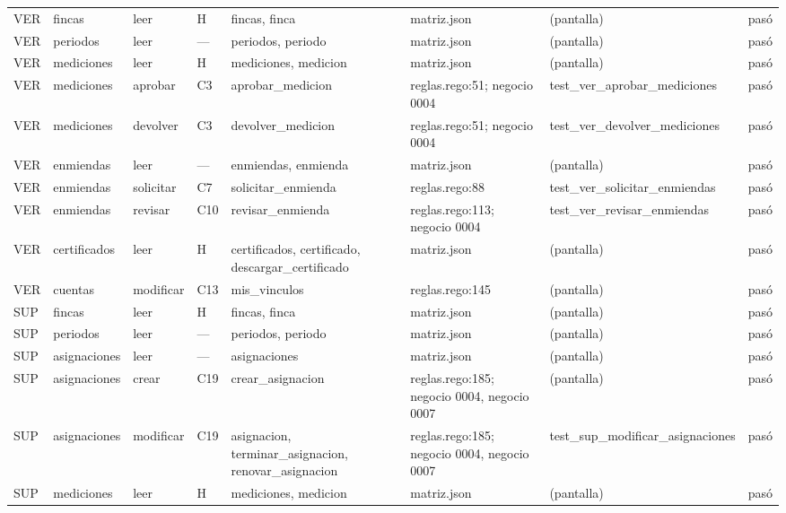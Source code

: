 \documentclass[11pt,letterpaper]{article}
\begin{document}
\begin{center}
\begin{longtable}{@{}p{0.6cm} p{1.7cm} p{1.2cm} p{0.9cm} p{3.4cm} p{2.6cm} p{3.4cm} p{0.8cm}@{}}
VER & fincas & leer & H & fincas, \allowbreak{}finca & matriz.json & (pantalla) & pasó \\
VER & periodos & leer & — & periodos, \allowbreak{}periodo & matriz.json & (pantalla) & pasó \\
VER & mediciones & leer & H & mediciones, \allowbreak{}medicion & matriz.json & (pantalla) & pasó \\
VER & mediciones & aprobar & C3 & aprobar\_medicion & reglas.rego:51; negocio 0004 & test\_\allowbreak{}ver\_\allowbreak{}aprobar\_\allowbreak{}mediciones & pasó \\
VER & mediciones & devolver & C3 & devolver\_medicion & reglas.rego:51; negocio 0004 & test\_\allowbreak{}ver\_\allowbreak{}devolver\_\allowbreak{}mediciones & pasó \\
VER & enmiendas & leer & — & enmiendas, \allowbreak{}enmienda & matriz.json & (pantalla) & pasó \\
VER & enmiendas & solicitar & C7 & solicitar\_enmienda & reglas.rego:88 & test\_\allowbreak{}ver\_\allowbreak{}solicitar\_\allowbreak{}enmiendas & pasó \\
VER & enmiendas & revisar & C10 & revisar\_enmienda & reglas.rego:113; negocio 0004 & test\_\allowbreak{}ver\_\allowbreak{}revisar\_\allowbreak{}enmiendas & pasó \\
VER & certificados & leer & H & certificados, \allowbreak{}certificado, \allowbreak{}descargar\_certificado & matriz.json & (pantalla) & pasó \\
VER & cuentas & modificar & C13 & mis\_vinculos & reglas.rego:145 & (pantalla) & pasó \\
SUP & fincas & leer & H & fincas, \allowbreak{}finca & matriz.json & (pantalla) & pasó \\
SUP & periodos & leer & — & periodos, \allowbreak{}periodo & matriz.json & (pantalla) & pasó \\
SUP & asignaciones & leer & — & asignaciones & matriz.json & (pantalla) & pasó \\
SUP & asignaciones & crear & C19 & crear\_asignacion & reglas.rego:185; negocio 0004, negocio 0007 & (pantalla) & pasó \\
SUP & asignaciones & modificar & C19 & asignacion, \allowbreak{}terminar\_asignacion, \allowbreak{}renovar\_asignacion & reglas.rego:185; negocio 0004, negocio 0007 & test\_\allowbreak{}sup\_\allowbreak{}modificar\_\allowbreak{}asignaciones & pasó \\
SUP & mediciones & leer & H & mediciones, \allowbreak{}medicion & matriz.json & (pantalla) & pasó \\

\end{longtable}
\end{center}
\end{document}
